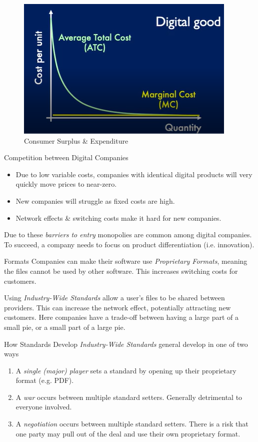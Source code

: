 \documentclass[11pt,a4paper]{article}
\begin{document}
\begin{figure}[ht!]
  \centering
  \includegraphics[width=.5\textwidth]{digitalCostCurve.PNG}
  \caption{Consumer Surplus \& Expenditure}
\end{figure}

\begin{remark}{Competition between Digital Companies}
  \begin{itemize}
    \item Due to low variable costs, companies with identical digital products will very quickly move prices to near-zero.
    \item New companies will struggle as fixed costs are high.
    \item Network effects \& switching costs make it hard for new companies.
  \end{itemize}
  Due to these \textit{barriers to entry} monopolies are common among digital companies. To succeed, a company needs to focus on product differentiation (i.e. innovation).
\end{remark}

\begin{remark}{Formats}
  Companies can make their software use \textit{Proprietary Formats}, meaning the files cannot be used by other software. This increases switching costs for customers.
  \par Using \textit{Industry-Wide Standards} allow a user's files to be shared between providers. This can increase the network effect, potentially attracting new customers. Here companies have a trade-off between having a large part of a small pie, or a small part of a large pie.
\end{remark}

\begin{remark}{How Standards Develop}
  \textit{Industry-Wide Standards} general develop in one of two ways
  \begin{enumerate}
    \item A \textit{single (major) player} sets a standard by opening up their proprietary format (e.g. PDF).
    \item A \textit{war} occurs between multiple standard setters. Generally detrimental to everyone involved.
    \item A \textit{negotiation} occurs between multiple standard setters. There is a risk that one party may pull out of the deal and use their own proprietary format.
  \end{enumerate}
\end{remark}
\end{document}
